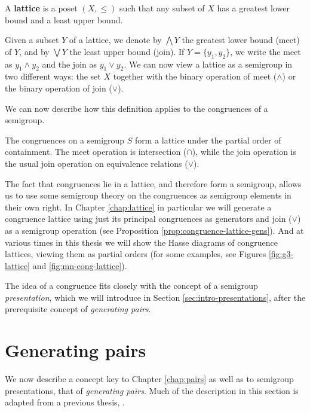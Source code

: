 \begin{definition}
  \label{def:lattice}
  A \textbf{lattice} is a poset $(X, \leq)$ such that any subset of $X$ has
  a greatest lower bound and a least upper bound.
\end{definition}

Given a subset $Y$ of a lattice, we denote by $\bigwedge Y$ the greatest lower
bound (meet) of $Y$, and by $\bigvee Y$ the least upper bound (join).  If
$Y = \{y_1, y_2\}$, we write the meet as $y_1 \wedge y_2$ and the join as
$y_1 \vee y_2$.  We can now view a lattice as a semigroup in two different ways:
the set $X$ together with the binary operation of meet ($\wedge$) or the binary
operation of join ($\vee$).

We can now describe how this definition applies to the congruences of a
semigroup.

\begin{proposition}
  \label{prop:cong-lattice}
  The congruences on a semigroup $S$ form a lattice under the partial order of
  containment.  The meet operation is intersection ($\cap$), while the join
  operation is the usual join operation on equivalence relations ($\vee$).
\end{proposition}

The fact that congruences lie in a lattice, and therefore form a semigroup,
allows us to use some semigroup theory on the congruences as semigroup elements
in their own right.  In Chapter \ref{chap:lattice} in particular we will
generate a congruence lattice using just its principal congruences as generators
and join ($\vee$) as a semigroup operation (see Proposition
\ref{prop:congruence-lattice-gens}).  And at various times in this thesis
we will show the Hasse diagrams of congruence lattices, viewing them as partial
orders (for some examples, see Figures \ref{fig:g3-lattice} and
\ref{fig:mn-cong-lattice}).

The idea of a congruence fits closely with the concept of a semigroup
\textit{presentation}, which we will introduce in Section
\ref{sec:intro-presentations}, after the prerequisite concept of
\textit{generating pairs}.

\section{Generating pairs}
\label{sec:intro-gen-pairs}

We now describe a concept key to Chapter \ref{chap:pairs} as well as to
semigroup presentations, that of \textit{generating pairs}.  Much of the
description in this section is adapted from a previous thesis,
\cite{mtorpey_msc}.

